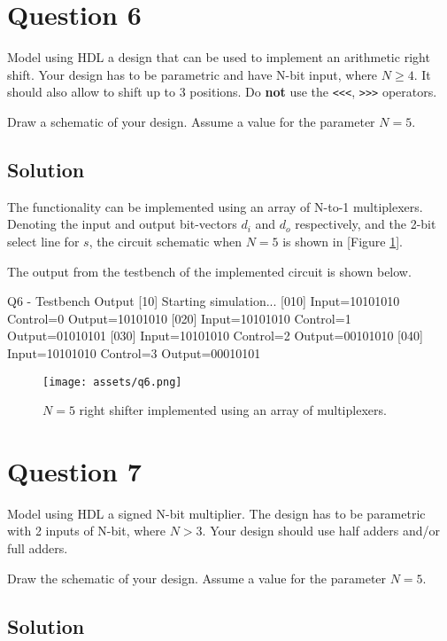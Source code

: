 \documentclass[../main.tex]{subfiles}
\begin{document}
\section{Question 6}

Model using HDL a design that can be used to implement an arithmetic right shift. Your design has to be parametric and have N-bit input, where $N \geq 4$. It should also allow to shift up to 3 positions. Do \textbf{not} use the \texttt{<<<}, \texttt{>>>} operators.

Draw a schematic of your design. Assume a value for the parameter $N = 5$.

\subsection*{Solution}

The functionality can be implemented using an array of N-to-1 multiplexers. Denoting the input and output bit-vectors $d_i$ and $d_o$ respectively, and the 2-bit select line for $s$, the circuit schematic when $N = 5$ is shown in [Figure \ref{q6}].

The output from the testbench of the implemented circuit is shown below.

\begin{mintedterminal}{Q6 - Testbench Output}
[10] Starting simulation...
[010] Input=10101010 Control=0 Output=10101010
[020] Input=10101010 Control=1 Output=01010101
[030] Input=10101010 Control=2 Output=00101010
[040] Input=10101010 Control=3 Output=00010101
\end{mintedterminal}

\begin{figure}[h]
    \centering
    \texttt{[image: assets/q6.png]}
    \caption{$N = 5$ right shifter implemented using an array of multiplexers.}
    \label{q6}
\end{figure}

\newpage

\section{Question 7}

Model using HDL a signed N-bit multiplier. The design has to be parametric with 2 inputs of N-bit, where $N > 3$. Your design should use half adders and/or full adders.

Draw the schematic of your design. Assume a value for the parameter $N = 5$.

\subsection*{Solution}
\end{document}
